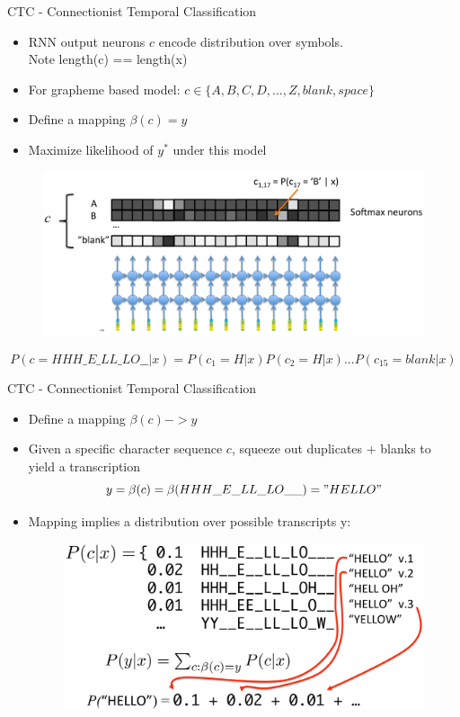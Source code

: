 \documentclass[10pt]{beamer}
\begin{document}
\begin{frame}[fragile]{CTC - Connectionist Temporal Classification}
\begin{itemize}
	\item RNN output neurons $c$ encode distribution over symbols.\\
	Note length(c) == length(x)
	\item For grapheme based model: $c \in \{A,B,C,D,...,Z,blank,space\}$
	\item Define a mapping $\beta(c) = y$
	\item Maximize likelihood of $y^{*}$ under this model
\end{itemize}
\begin{figure}
	\includegraphics[height=0.4\textheight]{./images/page-22.png}
\end{figure}


\begin{center}
	$$P(c=HHH\_E\_LL\_LO\_\_|x) = P(c_1=H|x)P(c_2=H|x) ... P(c_{15}=blank|x)$$
\end{center}

\end{frame}


\begin{frame}[fragile]{CTC - Connectionist Temporal Classification}
\begin{itemize}
	\item Define a mapping $\beta(c) -> y$
	\item Given a specific character sequence $c$, squeeze out duplicates + blanks to yield a transcription
	$$y = \beta(c) = \beta(HHH\_E\_LL\_LO\_\_) = "HELLO"$$
	\item Mapping implies a distribution over possible transcripts y:
	\begin{figure}
		\includegraphics[height=0.4\textheight]{./images/page-25.png}
	\end{figure}
\end{itemize}
\end{frame}
\end{document}
